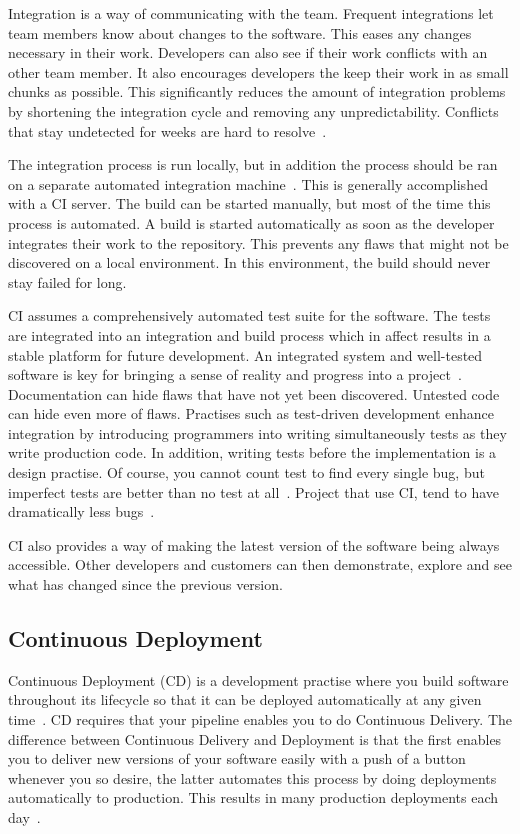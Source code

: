 \documentclass[english]{tktltiki2}
\begin{document}
Integration is a way of communicating with the team. Frequent integrations let team members know about changes to the software. This eases any changes necessary in their work. Developers can also see if their work conflicts with an other team member. It also encourages developers the keep their work in as small chunks as possible. This significantly reduces the amount of integration problems by shortening the integration cycle and removing any unpredictability. Conflicts that stay undetected for weeks are hard to resolve~\cite{Fow06}.

The integration process is run locally, but in addition the process should be ran on a separate automated integration machine~\cite{Fow06}. This is generally accomplished with a CI server. The build can be started manually, but most of the time this process is automated. A build is started automatically as soon as the developer integrates their work to the repository. This prevents any flaws that might not be discovered on a local environment. In this environment, the build should never stay failed for long.

CI assumes a comprehensively automated test suite for the software. The tests are integrated into an integration and build process which in affect results in a stable platform for future development. An integrated system and well-tested software is key for bringing a sense of reality and progress into a project~\cite{Fow05}. Documentation can hide flaws that have not yet been discovered. Untested code can hide even more of flaws. Practises such as test-driven development enhance integration by introducing programmers into writing simultaneously tests as they write production code. In addition, writing tests before the implementation is a design practise. Of course, you cannot count test to find every single bug, but imperfect tests are better than no test at all~\cite{Fow06}. Project that use CI, tend to have dramatically less bugs~\cite{Fow06}.

CI also provides a way of making the latest version of the software being always accessible. Other developers and customers can then demonstrate, explore and see what has changed since the previous version.

\subsection{Continuous Deployment}

Continuous Deployment (CD) is a development practise where you build software throughout its lifecycle so that it can be deployed automatically at any given time~\cite{Fow13a}. CD requires that your pipeline enables you to do Continuous Delivery. The difference between Continuous Delivery and Deployment is that the first enables you to deliver new versions of your software easily with a push of a button whenever you so desire, the latter automates this process by doing deployments automatically to production. This results in many production deployments each day~\cite{OR11, Sny13, Rub14}.
\end{document}
